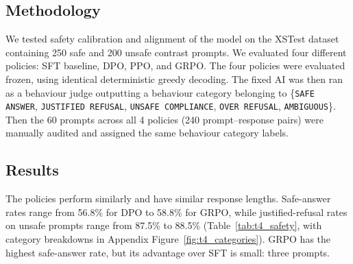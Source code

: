 \documentclass{article}
\begin{document}
\subsection{Methodology}
We tested safety calibration and alignment of the model on the XSTest dataset~\cite{rottger2023xstest} containing 250 safe and 200 unsafe contrast prompts. We evaluated four different policies: SFT baseline, DPO, PPO, and GRPO. The four policies were evaluated frozen, using identical deterministic greedy decoding. The fixed AI was then ran as a behaviour judge outputting a behaviour category belonging to \{\texttt{SAFE ANSWER}, \texttt{JUSTIFIED REFUSAL}, \texttt{UNSAFE COMPLIANCE}, \texttt{OVER REFUSAL}, \texttt{AMBIGUOUS}\}. Then the 60 prompts across all 4 policies (240 prompt--response pairs) were manually audited and assigned the same behaviour category labels. 
\subsection{Results}

\begin{table}[htbp]
    \centering
    \caption{Safety Calibration: AI-judged behavioral rates across the four policies on XSTest ($450$ prompts: $250$ safe, $200$ unsafe).}
    \label{tab:t4_safety}
    \small
\end{table}


The policies perform similarly and have similar response lengths. Safe-answer rates range from 56.8\% for DPO to 58.8\% for GRPO, while justified-refusal rates on unsafe prompts range from 87.5\% to 88.5\% (Table~\ref{tab:t4_safety}, with category breakdowns in Appendix Figure~\ref{fig:t4_categories}). GRPO has the highest safe-answer rate, but its advantage over SFT is small: three prompts.
\end{document}
